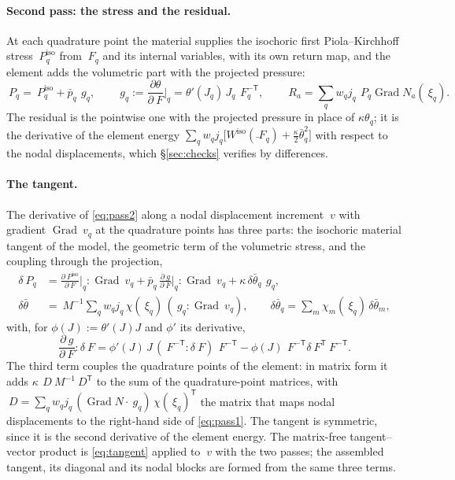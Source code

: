 \documentclass[11pt]{article}
\newcommand{\F}{~F}
\renewcommand{\P}{~P}
\newcommand{\Grad}{\operatorname{Grad}}
\newcommand{\transpose}[1]{#1^{\mathsf{T}}}
\newcommand{\supiso}{^{\mathrm{iso}}}
\theoremstyle{definition}
\theoremstyle{plain}
\begin{document}
\paragraph{Second pass: the stress and the residual.} At each quadrature
point the material supplies the isochoric first Piola--Kirchhoff stress
$\P\supiso_q$ from $\F_q$ and its internal variables, with its own return
map, and the element adds the volumetric part with the projected pressure:
\begin{equation}
  \label{eq:pass2}
  \P_q = \P\supiso_q + \bar p_q\, ~g_q,
  \qquad
  ~g_q := \frac{\partial\theta}{\partial\F}\Big|_q = \theta'(J_q)\, J_q\, \F_q^{-\mathsf T},
  \qquad
  ~R_a = \sum_q w_q j_q\, \P_q \Grad N_a(~\xi_q) .
\end{equation}
The residual is the pointwise one with the projected pressure in place of
$\kappa\theta_q$; it is the derivative of the element energy
$\sum_q w_q j_q \big[ W\supiso(\bar\F_q) + \tfrac{\kappa}{2} \bar\theta_q^2 \big]$
with respect to the nodal displacements, which \S\ref{sec:checks} verifies
by differences.

\paragraph{The tangent.} The derivative of \eqref{eq:pass2} along a nodal
displacement increment $~v$ with gradient $\Grad~v_q$ at the quadrature
points has three parts: the isochoric material tangent of the model, the
geometric term of the volumetric stress, and the coupling through the
projection,
\begin{equation}
  \label{eq:tangent}
  \begin{aligned}
  \delta\P_q &= \frac{\partial\P\supiso}{\partial\F}\Big|_q : \Grad~v_q
  + \bar p_q\, \frac{\partial ~g}{\partial\F}\Big|_q : \Grad~v_q
  + \kappa\, \delta\bar\theta_q\, ~g_q, \\
  \delta\bar\theta &= ~M^{-1} \sum_q w_q j_q\, \chi(~\xi_q)\, (~g_q : \Grad~v_q),
  \qquad
  \delta\bar\theta_q = \sum_m \chi_m(~\xi_q)\, \delta\bar\theta_m ,
  \end{aligned}
\end{equation}
with, for $\phi(J) := \theta'(J) J$ and $\phi'$ its derivative,
\begin{equation}
  \label{eq:dg}
  \frac{\partial ~g}{\partial\F} : \delta\F
  = \phi'(J)\, J\, (\F^{-\mathsf T} : \delta\F)\, \F^{-\mathsf T}
  - \phi(J)\, \F^{-\mathsf T} \transpose{\delta\F} \F^{-\mathsf T} .
\end{equation}
The third term couples the quadrature points of the element: in matrix form
it adds $\kappa\, ~D ~M^{-1} \transpose{~D}$ to the sum of the
quadrature-point matrices, with $~D = \sum_q w_q j_q\, (\Grad N \cdot
~g_q)\, \transpose{\chi(~\xi_q)}$ the matrix that maps nodal displacements
to the right-hand side of \eqref{eq:pass1}. The tangent is symmetric, since
it is the second derivative of the element energy. The matrix-free
tangent--vector product is \eqref{eq:tangent} applied to $~v$ with the
two passes; the assembled tangent, its diagonal and its nodal blocks are
formed from the same three terms.
\end{document}
